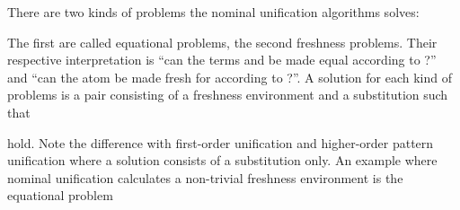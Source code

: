 \begin{isabellebody}
\begin{isamarkuptext}
  \noindent
  There are two kinds of problems the nominal unification algorithms solves:

  \begin{center}
   \hspace{10mm} 
  \end{center}

  \noindent
  The first are called equational problems, the second freshness problems.
  Their respective interpretation is ``can the terms  and  be made
  equal according to ?'' and ``can the atom  be made fresh for
   according to ?''. A solution for each kind of problems is a pair  
  consisting of a freshness environment and a substitution such that

  \begin{center}
   \hspace{10mm} 
  \end{center}

  \noindent
  hold. Note the difference with first-order unification and higher-order pattern unification
  where a solution consists of a substitution only. An example where nominal unification
  calculates a non-trivial
  freshness environment is the equational problem


\end{isamarkuptext}
\end{isabellebody}
